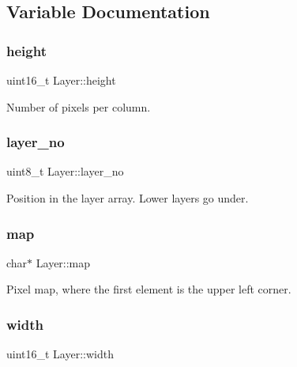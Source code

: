 \subsection{Variable Documentation}
\mbox{\label{group__layer_ga55165612a9f4da7933dde862c7a54406}} 
\subsubsection{\texorpdfstring{height}{height}}
{\footnotesize\ttfamily uint16\+\_\+t Layer\+::height}



Number of pixels per column. 

\mbox{\label{group__layer_ga0c56f7ad3a85bd2173f52e11176f791c}} 
\subsubsection{\texorpdfstring{layer\+\_\+no}{layer\_no}}
{\footnotesize\ttfamily uint8\+\_\+t Layer\+::layer\+\_\+no}



Position in the layer array. Lower layers go under. 

\mbox{\label{group__layer_ga4439f4ca4c45e80cb99cf0445226a1c7}} 
\subsubsection{\texorpdfstring{map}{map}}
{\footnotesize\ttfamily char$\ast$ Layer\+::map}



Pixel map, where the first element is the upper left corner. 

\mbox{\label{group__layer_ga9d1e4ca46204961e88006f131c697e97}} 
\subsubsection{\texorpdfstring{width}{width}}
{\footnotesize\ttfamily uint16\+\_\+t Layer\+::width}



